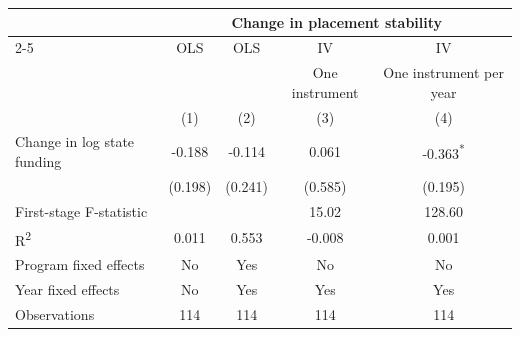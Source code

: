 \begin{table}[htbp]
\centering
\label{tab:iv_place_stability}
\begin{tabular}{l*{4}{c}}
\toprule
 & \multicolumn{4}{c}{Change in placement stability} \\
\cmidrule(lr){2-5}
 & OLS & OLS & IV & IV \\
 &  &  & One instrument & One instrument per year \\
 & (1) & (2) & (3) & (4) \\
\midrule
Change in log state funding & -0.188 & -0.114 & 0.061 & -0.363\textsuperscript{*} \\
 & (0.198) & (0.241) & (0.585) & (0.195) \\
First-stage F-statistic &  &  & 15.02 & 128.60 \\
R\textsuperscript{2} & 0.011 & 0.553 & -0.008 & 0.001 \\
Program fixed effects & No & Yes & No & No \\
Year fixed effects & No & Yes & Yes & Yes \\
Observations & 114 & 114 & 114 & 114 \\
\bottomrule
\end{tabular}
\end{table}

